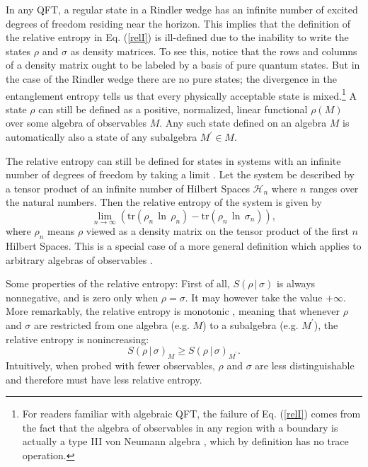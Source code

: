 \documentclass[12pt]{article}
\begin{document}
In any QFT, a regular state in a Rindler wedge has an infinite number of excited degrees of freedom residing near the horizon.  This implies that the definition of the relative entropy in Eq. (\ref{relI}) is ill-defined due to the inability to write the states $\rho$ and $\sigma$ as density matrices.  To see this, notice that the rows and columns of a density matrix ought to be labeled by a basis of pure quantum states.  But in the case of the Rindler wedge there are no pure states; the divergence in the entanglement entropy tells us that every physically acceptable state is mixed.\footnote{For readers familiar with algebraic QFT, the failure of Eq. (\ref{relI}) comes from the fact that the algebra of observables in any region with a boundary is actually a type III von Neumann algebra \cite{BAF87}, which by definition has no trace operation.}  A state $\rho$ can still be defined as a positive, normalized, linear functional 
$\rho(M)$ over some algebra of observables $M$.  Any such state defined on an algebra $M$ is automatically also a state of any subalgebra $M^\prime \in M$.

The relative entropy can still be defined for states in systems with an infinite number of degrees of freedom by taking a limit \cite{araki75}.  Let the system be described by a tensor product of an infinite number of Hilbert Spaces $\mathcal{H}_n$ where $n$ ranges over the natural numbers.  Then the relative entropy of the system is given by
\begin{equation}
\lim_{n \to \infty} (\mathrm{tr}(\rho_n\,\ln\,\rho_n) - \mathrm{tr}(\rho_n\,\ln\,\sigma_n)),
\end{equation}
where $\rho_n$ means $\rho$ viewed as a density matrix on the tensor product of the first $n$ Hilbert Spaces.  This is a special case of a more general definition which applies to arbitrary algebras of observables \cite{araki75}.

Some properties of the relative entropy: First of all, $S(\rho\,|\,\sigma)$ is always nonnegative, and is zero only when $\rho = \sigma$.  It may however take the value $+\infty$.  
More remarkably, the relative entropy is monotonic \cite{lindblad75}, meaning that whenever $\rho$ and $\sigma$ are restricted from one algebra (e.g. $M$) to a subalgebra (e.g. $M^{\prime}$), the relative entropy is nonincreasing:
\begin{equation}\label{mono}
S(\rho\,|\,\sigma)_M \ge S(\rho\,|\,\sigma)_{M^{\prime}}.
\end{equation}
Intuitively, when probed with fewer observables, $\rho$ and $\sigma$ are less distinguishable and therefore must have less relative entropy.  
\end{document}
